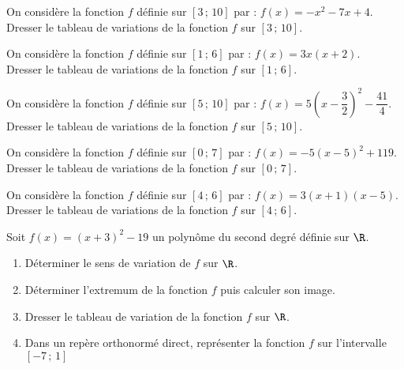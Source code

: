 \documentclass[11pt]{article}
\begin{document}
\newpage

\phantom{0}
\vspace{-1cm}

\begin{exercice}
  \begin{enu}
	\item On considère la fonction $f$ définie sur $[3\,;\,10]$ par : $f(x)=-x^2-7x+4$.\\Dresser le tableau de  variations de la fonction $f$ sur $[3\,;\,10]$.
	\item On considère la fonction $f$ définie sur $[1\,;\,6]$ par : $f(x)=3x(x+2)$.\\Dresser le tableau de  variations de la fonction $f$ sur $[1\,;\,6]$.
	\item On considère la fonction $f$ définie sur $[5\,;\,10]$ par : $f(x)=5\left(x -\dfrac{3}{2}\right)^2 -\dfrac{41}{4}$.\\Dresser le tableau de  variations de la fonction $f$ sur $[5\,;\,10]$.
	\item On considère la fonction $f$ définie sur $[0\,;\,7]$ par : $f(x)=-5\left(x -5\right)^2 +119$.\\Dresser le tableau de  variations de la fonction $f$ sur $[0\,;\,7]$.
	\item On considère la fonction $f$ définie sur $[4\,;\,6]$ par : $f(x)=3(x+1)(x-5)$.\\Dresser le tableau de  variations de la fonction $f$ sur $[4\,;\,6]$.
  \end{enu}
\end{exercice}

\vspace{-.5cm}

\begin{exercice}
  Soit $f(x)=\left(x +3\right)^2 -19$ un polynôme du second degré définie sur $\R$.
  \begin{enumerate}
  \item Déterminer le sens de variation de $f$ sur $\R$.
  \item Déterminer l'extremum de la fonction $f$ puis calculer son
    image.
  \item Dresser le tableau de variation de la fonction $f$ sur $\R$.
  \item Dans un repère orthonormé direct, représenter la fonction $f$ sur l'intervalle
    $[-7\,;\,1]$
  \end{enumerate}
\end{exercice}
\end{document}
